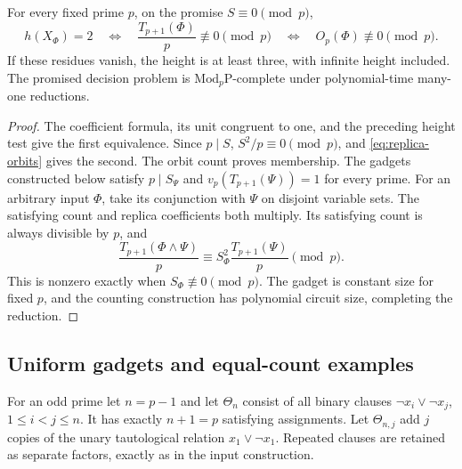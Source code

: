 \begin{theorem}
For every fixed prime $p$, on the promise $S\equiv0\pmod p$,
\[
 h(X_\Phi)=2
 \quad\Longleftrightarrow\quad
 \frac{T_{p+1}(\Phi)}p\not\equiv0\pmod p
 \quad\Longleftrightarrow\quad O_p(\Phi)\not\equiv0\pmod p.
\]
If these residues vanish, the height is at least three, with infinite
height included.  The promised decision problem is
$\mathrm{Mod}_p\mathrm P$-complete under polynomial-time many-one
reductions.
\end{theorem}
\begin{proof}
The coefficient formula, its unit congruent to one, and the preceding
height test give the first equivalence.  Since $p\mid S$,
$S^2/p\equiv0\pmod p$, and \eqref{eq:replica-orbits} gives the second.
The orbit count proves membership.  The gadgets constructed below
satisfy $p\mid S_\Psi$ and $v_p(T_{p+1}(\Psi))=1$ for every prime.
For an arbitrary input $\Phi$, take its conjunction with $\Psi$ on
disjoint variable sets.  The satisfying count and replica coefficients
both multiply.  Its satisfying count is always divisible by $p$, and
\[
 \frac{T_{p+1}(\Phi\wedge\Psi)}p
 \equiv S_\Phi^2\frac{T_{p+1}(\Psi)}p\pmod p.
\]
This is nonzero exactly when $S_\Phi\not\equiv0\pmod p$.
The gadget is constant size for fixed $p$, and the counting
construction has polynomial circuit size, completing the reduction.
\end{proof}

\subsection{Uniform gadgets and equal-count examples}
For an odd prime let $n=p-1$ and let $\Theta_n$ consist of all binary
clauses $\neg x_i\vee\neg x_j$, $1\leq i<j\leq n$.
It has exactly $n+1=p$ satisfying assignments.  Let $\Theta_{n,j}$
add $j$ copies of the unary tautological relation $x_1\vee\neg x_1$.
Repeated clauses are retained as separate factors, exactly as in the
input construction.

